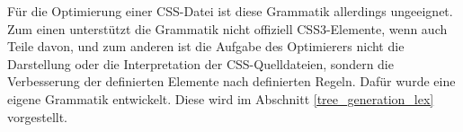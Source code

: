 Für die Optimierung einer CSS-Datei ist diese Grammatik allerdings ungeeignet. Zum einen unterstützt die Grammatik nicht offiziell CSS3-Elemente, wenn auch Teile davon, und zum anderen ist die Aufgabe des Optimierers nicht die Darstellung oder die Interpretation der CSS-Quelldateien, sondern die Verbesserung der definierten Elemente nach definierten Regeln. Dafür wurde eine eigene Grammatik entwickelt. Diese wird im Abschnitt \ref{tree_generation_lex} vorgestellt. 


